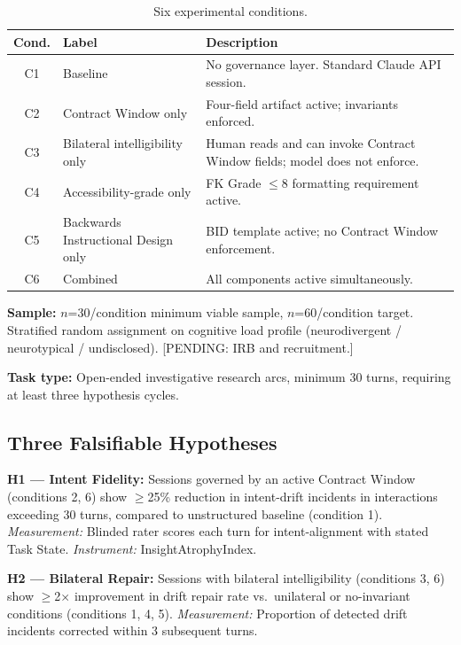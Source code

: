 \documentclass{article}
\newcommand{\cw}{Contract Window\xspace}
\newcommand{\iai}{InsightAtrophyIndex\xspace}
\newcommand{\pending}[1]{\textcolor{pendingred}{[PENDING: #1]}}
\begin{document}
\begin{table}[t]
\centering
\caption{Six experimental conditions.}
\label{tab:conditions}
\begin{tabular}{clp{7cm}}
\toprule
\textbf{Cond.} & \textbf{Label} & \textbf{Description} \\
\midrule
C1 & Baseline &
  No governance layer. Standard Claude API session. \\
C2 & \cw{} only &
  Four-field artifact active; invariants enforced. \\
C3 & Bilateral intelligibility only &
  Human reads and can invoke \cw{} fields; model does not enforce. \\
C4 & Accessibility-grade only &
  FK Grade $\leq$8 formatting requirement active. \\
C5 & Backwards Instructional Design only &
  BID template active; no \cw{} enforcement. \\
C6 & Combined &
  All components active simultaneously. \\
\bottomrule
\end{tabular}
\end{table}

\textbf{Sample:} $n$=30/condition minimum viable sample, $n$=60/condition
target. Stratified random assignment on cognitive load profile
(neurodivergent / neurotypical / undisclosed). \pending{IRB and recruitment.}

\textbf{Task type:} Open-ended investigative research arcs, minimum 30 turns,
requiring at least three hypothesis cycles.

\subsection{Three Falsifiable Hypotheses}

\textbf{H1 --- Intent Fidelity:}
Sessions governed by an active \cw{} (conditions 2, 6) show $\geq$25\%
reduction in intent-drift incidents in interactions exceeding 30 turns,
compared to unstructured baseline (condition 1).
\textit{Measurement:} Blinded rater scores each turn for intent-alignment with
stated Task State. \textit{Instrument:} \iai.

\textbf{H2 --- Bilateral Repair:}
Sessions with bilateral intelligibility (conditions 3, 6) show $\geq$2$\times$
improvement in drift repair rate vs.\ unilateral or no-invariant conditions
(conditions 1, 4, 5).
\textit{Measurement:} Proportion of detected drift incidents corrected within
3 subsequent turns.
\end{document}
